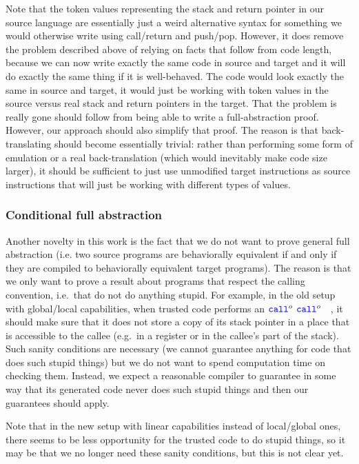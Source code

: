 \documentclass[a3paper]{article}
\newcommand{\sourcecolor}{\color{blue}}
\newcommand{\src}[1]{{\sourcecolor #1}}
\newcommand{\zinstr}[1]{\texttt{#1}}
\newcommand{\scall}[4][]{  
\ifthenelse{\equal{#3#4}{}}
  {\ensuremath{\zinstr{\src{call}}_{#1}^{#2}}}
  {\ensuremath{\zinstr{\src{call}}_{#1}^{#2} \; #3 \; #4}}
}
\begin{document}
Note that the token values representing the stack and return pointer in our source language are essentially just a weird alternative syntax for something we would otherwise write using call/return and push/pop.
However, it does remove the problem described above of relying on facts that follow from code length, because we can now write exactly the same code in source and target and it will do exactly the same thing if it is well-behaved.
The code would look exactly the same in source and target, it would just be working with token values in the source versus real stack and return pointers in the target.
That the problem is really gone should follow from being able to write a full-abstraction proof.
However, our approach should also simplify that proof.
The reason is that back-translating should become essentially trivial: rather than performing some form of emulation or a real back-translation (which would inevitably make code size larger), it should be sufficient to just use unmodified target instructions as source instructions that will just be working with different types of values.


\subsubsection{Conditional full abstraction}
\label{sec:conditional-full-abstraction}

Another novelty in this work is the fact that we do not want to prove general full abstraction (i.e. two source programs are behaviorally equivalent if and only if they are compiled to behaviorally equivalent target programs).
The reason is that we only want to prove a result about programs that respect the calling convention, i.e.\ that do not do anything stupid.
For example, in the old setup with global/local capabilities, when trusted code performs an \scall{o}{}{}, it should make sure that it does not store a copy of its stack pointer in a place that is accessible to the callee (e.g.\ in a register or in the callee's part of the stack).
Such sanity conditions are necessary (we cannot guarantee anything for code that does such stupid things) but we do not want to spend computation time on checking them.
Instead, we expect a reasonable compiler to guarantee in some way that its generated code never does such stupid things and then our guarantees should apply.

Note that in the new setup with linear capabilities instead of local/global ones, there seems to be less opportunity for the trusted code to do stupid things, so it may be that we no longer need these sanity conditions, but this is not clear yet.
\end{document}
